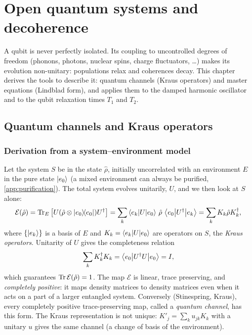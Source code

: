 \chapter{Open quantum systems and decoherence}\label{ch:open}

A qubit is never perfectly isolated. Its coupling to uncontrolled degrees of freedom (phonons, photons, nuclear spins, charge fluctuators, \dots) makes its evolution
non-unitary: populations relax and coherences decay. This chapter derives the tools to describe it: quantum channels (Kraus operators) and master equations
(Lindblad form), and applies them to the damped harmonic oscillator and to the qubit relaxation times $T_1$ and $T_2$.

\section{Quantum channels and Kraus operators}
\subsection{Derivation from a system--environment model}
Let the system $S$ be in the state $\hat\rho$, initially uncorrelated with an environment $E$ in the pure state $\left|e_0\right\rangle$ (a mixed environment can always be
purified, \cref{app:purification}). The total system evolves unitarily, $U$, and we then look at $S$ alone:
\begin{equation}
  \mathcal E(\hat\rho)=\operatorname{Tr}_E\left[U(\hat\rho\otimes\left|e_0\middle\rangle\!\middle\langle e_0\right|)U^\dagger\right]=\sum_k\left\langle e_k\middle|U\middle|e_0\right\rangle\,\hat\rho\,\left\langle e_0\middle|U^\dagger\middle|e_k\right\rangle=\sum_kK_k\hat\rho K_k^\dagger,
\end{equation}
where $\{\left|e_k\right\rangle\}$ is a basis of $E$ and $K_k=\left\langle e_k\middle|U\middle|e_0\right\rangle$ are operators on $S$, the \emph{Kraus operators}. Unitarity of $U$ gives the completeness relation
\begin{equation}
  \sum_kK_k^\dagger K_k=\left\langle e_0\middle|U^\dagger U\middle|e_0\right\rangle=I,
\end{equation}
which guarantees $\operatorname{Tr}\mathcal E(\hat\rho)=1$. The map $\mathcal E$ is linear, trace preserving, and \emph{completely positive}: it maps density matrices to density matrices even
when it acts on a part of a larger entangled system. Conversely (Stinespring, Kraus), every completely positive trace-preserving map, called a \emph{quantum channel},
has this form. The Kraus representation is not unique: $K'_j=\sum_ku_{jk}K_k$ with a unitary $u$ gives the same channel (a change of basis of the environment).

